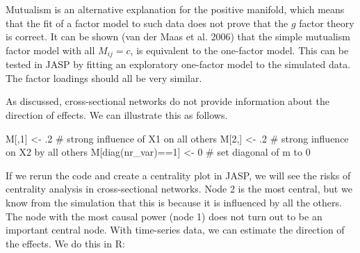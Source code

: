 \documentclass[
  a4paper,
  DIV=11,
  numbers=noendperiod,
  oneside]{scrreprt}
\newenvironment{Shaded}{}{}
\newcommand{\CommentTok}[1]{\textcolor[rgb]{0.42,0.45,0.49}{#1}}
\newcommand{\DecValTok}[1]{\textcolor[rgb]{0.00,0.36,0.77}{#1}}
\newcommand{\FunctionTok}[1]{\textcolor[rgb]{0.44,0.26,0.76}{#1}}
\newcommand{\NormalTok}[1]{\textcolor[rgb]{0.14,0.16,0.18}{#1}}
\newcommand{\OtherTok}[1]{\textcolor[rgb]{0.44,0.26,0.76}{#1}}
\newcommand{\SpecialCharTok}[1]{\textcolor[rgb]{0.00,0.36,0.77}{#1}}
\begin{document}
Mutualism is an alternative explanation for the positive manifold, which
means that the fit of a factor model to such data does not prove that
the \(g\) factor theory is correct. It can be shown (van der Maas et al.
2006) that the simple mutualism factor model with all \(M_{ij} = c\), is
equivalent to the one-factor model. This can be tested in JASP by
fitting an exploratory one-factor model to the simulated data. The
factor loadings should all be very similar.

As discussed, cross-sectional networks do not provide information about
the direction of effects. We can illustrate this as follows.

\begin{Shaded}
\begin{Highlighting}[]
\NormalTok{M[,}\DecValTok{1}\NormalTok{] }\OtherTok{\textless{}{-}}\NormalTok{ .}\DecValTok{2} \CommentTok{\# strong influence of X1 on all others}
\NormalTok{M[}\DecValTok{2}\NormalTok{,] }\OtherTok{\textless{}{-}}\NormalTok{ .}\DecValTok{2} \CommentTok{\# strong influence on X2 by all others}
\NormalTok{M[}\FunctionTok{diag}\NormalTok{(nr\_var)}\SpecialCharTok{==}\DecValTok{1}\NormalTok{] }\OtherTok{\textless{}{-}} \DecValTok{0} \CommentTok{\# set diagonal of m to 0}
\end{Highlighting}
\end{Shaded}

If we rerun the code and create a centrality plot in JASP, we will see
the risks of centrality analysis in cross-sectional networks. Node 2 is
the most central, but we know from the simulation that this is because
it is influenced by all the others. The node with the most causal power
(node 1) does not turn out to be an important central node. With
time-series data, we can estimate the direction of the effects. We do
this in R:
\end{document}
